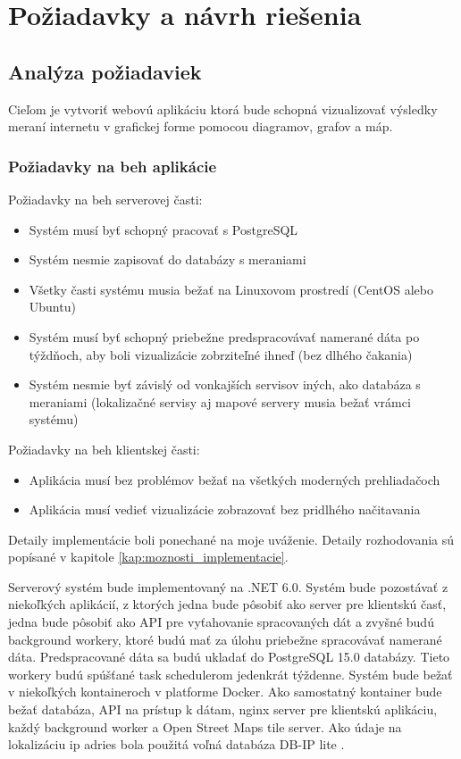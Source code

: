 \chapter{Požiadavky a návrh riešenia}

\label{kap:navrh_riesenia}

\section{Analýza požiadaviek}

Cieľom je vytvoriť webovú aplikáciu ktorá bude schopná vizualizovať výsledky meraní internetu v grafickej forme pomocou diagramov, 
grafov a máp. 

\subsection{Požiadavky na beh aplikácie}

Požiadavky na beh serverovej časti:
\begin{itemize}
    \item Systém musí byť schopný pracovať s PostgreSQL
    \item Systém nesmie zapisovať do databázy s meraniami
    \item Všetky časti systému musia bežať na Linuxovom prostredí (CentOS alebo Ubuntu)
    \item Systém musí byť schopný priebežne predspracovávať namerané dáta po týždňoch, 
    aby boli vizualizácie zobrziteľné ihneď (bez dlhého čakania)
    \item Systém nesmie byť závislý od vonkajších servisov iných, ako databáza s meraniami 
    (lokalizačné servisy aj mapové servery musia bežať vrámci systému)
\end{itemize}
Požiadavky na beh klientskej časti:
\begin{itemize}
    \item Aplikácia musí bez problémov bežať na všetkých moderných prehliadačoch
    \item Aplikácia musí vedieť vizualizácie zobrazovať bez pridlhého načitavania
\end{itemize}

Detaily implementácie boli ponechané na moje uváženie. Detaily rozhodovania sú popísané v kapitole \ref{kap:moznosti_implementacie}.

Serverový systém bude implementovaný na .NET 6.0. Systém bude pozostávať z niekoľkých aplikácií, z ktorých jedna bude pôsobiť ako 
server pre klientskú časť, jedna bude pôsobiť ako API pre vyťahovanie spracovaných dát a zvyšné budú background workery, ktoré budú mať za úlohu
priebežne spracovávať namerané dáta. Predspracované dáta sa budú ukladať do PostgreSQL 15.0 databázy. Tieto workery budú spúšťané task schedulerom
jedenkrát týždenne. Systém bude bežať v niekoľkých kontaineroch v platforme Docker. Ako samostatný kontainer bude bežať databáza, API na prístup k 
dátam, nginx server pre klientskú aplikáciu, každý background worker a Open Street Maps tile server. Ako údaje na lokalizáciu ip adries bola 
použitá voľná databáza DB-IP lite \cite{ip_city_db}.

